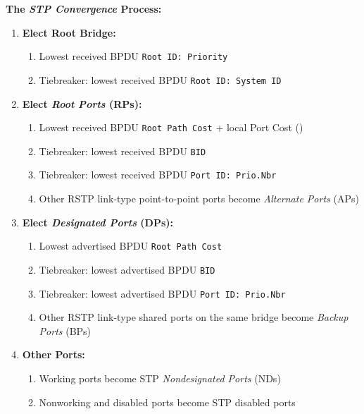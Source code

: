 \documentclass[12pt]{article}
\begin{document}
	\textbf{The \textit{STP Convergence} Process:}
	\begin{enumerate}
		\label{itm:STP CONVERGENCE}
		\item{\textbf{Elect Root Bridge:}}
		\begin{enumerate} \itemsep -5pt
			\item{Lowest received BPDU \texttt{Root ID: Priority}}
			\item{Tiebreaker: lowest received BPDU \texttt{Root ID: System ID}}
		\end{enumerate}
		\item{\textbf{Elect \textit{Root Ports} (RPs):}}
		\begin{enumerate} \itemsep -5pt
			\item{Lowest received BPDU \texttt{Root Path Cost} + local Port Cost ()}
			\item{Tiebreaker: lowest received BPDU \texttt{BID}}
			\item{Tiebreaker: lowest received BPDU \texttt{Port ID: Prio.Nbr}}
			\item{Other RSTP link-type point-to-point ports become \textit{Alternate Ports} (APs)}
		\end{enumerate}
		\item{\textbf{Elect \textit{Designated Ports} (DPs):}}
		\begin{enumerate} \itemsep -5pt
			\item{Lowest advertised BPDU \texttt{Root Path Cost}}
			\item{Tiebreaker: lowest advertised BPDU \texttt{BID}}
			\item{Tiebreaker: lowest advertised BPDU \texttt{Port ID: Prio.Nbr}}
			\item{Other RSTP link-type shared ports on the same bridge become \textit{Backup Ports} (BPs)}
		\end{enumerate}
		\item{\textbf{Other Ports:}}
		\begin{enumerate} \itemsep -5pt
			\item{Working ports become STP \textit{Nondesignated Ports} (NDs)}
			\item{Nonworking and disabled ports become STP disabled ports}
		\end{enumerate}
	\end{enumerate}
\end{document}
